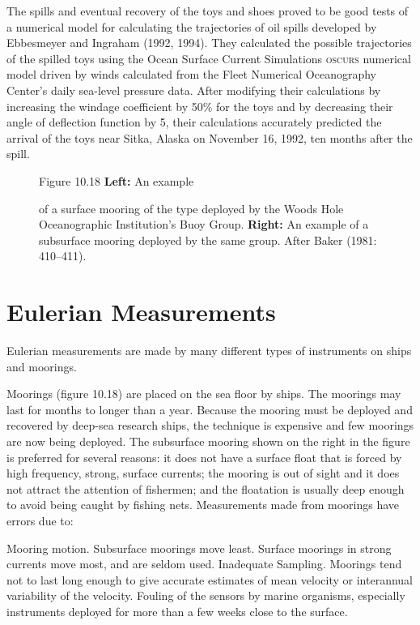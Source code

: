 The spills and eventual recovery of the toys and shoes proved to be good tests of a
numerical model for calculating the trajectories of oil spills developed by Ebbesmeyer
and Ingraham (1992, 1994). They calculated the possible trajectories of the spilled
toys using the Ocean Surface Current Simulations \textsc{oscurs} numerical model
driven by winds calculated from the Fleet Numerical Oceanography Center's daily
sea-level pressure data. After modifying their calculations by  increasing the windage
coefficient by 50\% for the toys and by decreasing their angle of deflection function by 5\degrees , their calculations accurately predicted the arrival of the toys near Sitka, Alaska on November 16, 1992, ten months after the spill.

\begin{figure}[b!]
\vspace{-3ex}
\footnotesize
Figure 10.18 \textbf{Left:} An example \rule{0mm}{3ex}of a surface
mooring of the type deployed by the Woods Hole Oceanographic Institution's Buoy
Group.
\textbf{Right:} An example of a subsurface mooring deployed by the same group.
After Baker (1981: 410--411).
\label{fig:moorings}
\end{figure}

\section{Eulerian Measurements}
Eulerian measurements are made by many different
types of instruments on ships and moorings.

Moorings (figure 10.18) are placed on the sea floor by ships. The moorings may last for months to longer than a year. Because the mooring must be deployed and recovered by deep-sea research ships, the technique is expensive and few moorings are now being deployed. The subsurface mooring shown on the right in the figure is preferred for several reasons: it does not have a surface float that is forced by high frequency, strong, surface currents; the mooring is out of sight and it does not attract the attention of fishermen; and the floatation is usually deep enough to avoid being caught by fishing nets. Measurements made from moorings have errors due to:
\begin{enumerate}
\vitem Mooring motion. Subsurface moorings move least. Surface moorings in strong
currents move most, and are seldom used.
\vitem Inadequate Sampling. Moorings tend not to last long enough to give
accurate estimates of mean velocity or interannual variability of the velocity.
\vitem Fouling of the sensors by marine organisms, especially instruments
deployed for more than a few weeks close to the surface.
\end{enumerate}

